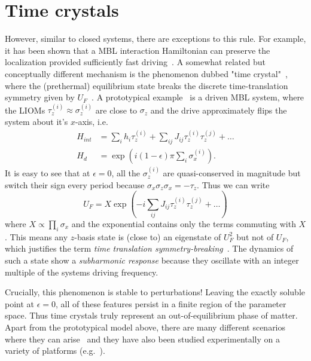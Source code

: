 \section{Time crystals}

However, similar to closed systems, there are exceptions to this rule.
For example, it has been shown that a MBL interaction Hamiltonian can preserve the localization provided sufficiently fast driving~\cite{abaninTheoryManybodyLocalization2016,burauFateAlgebraicManybody2021,sierantStabilityManybodyLocalization2023}. 
A somewhat related but conceptually different mechanism is the phenomenon dubbed "time crystal"~\cite{vonkeyserlingkAbsoluteStabilitySpatiotemporal2016,elsePrethermalPhasesMatter2017}, where the (prethermal) equilibrium state breaks the discrete time-translation symmetry given by $U_F$~\cite{khemaniBriefHistoryTime2019,elseDiscreteTimeCrystals2020a}. A prototypical example~\cite{elseFloquetTimeCrystals2016,elseDiscreteTimeCrystals2020a} is a driven MBL system, where the LIOMs $\tau_z^{(i)}\approx\sigma_z^{(i)}$ are close to $\sigma_z$ and the drive approximately flips the system about it's $x$-axis, i.e.
\begin{align}
	H_{int} &= \sum_i h_i \tau_z^{(i)} + \sum_{ij} J_{ij}\tau_z^{(i)}\tau_z^{(j)}+\ldots\\
	H_{d}&=\exp(i(1-\epsilon)\pi\sum_i \sigma_x^{(i)}).
\end{align}
It is easy to see that at $\epsilon=0$, all the $\sigma_z^{(i)}$ are quasi-conserved in magnitude but switch their sign every period because $\sigma_x \sigma_z \sigma_x = -\tau_z$. Thus we can write
\begin{equation}
	U_F = X\exp(-i\sum_{ij} J_{ij}\tau_z^{(i)}\tau_z^{(j)} + \ldots )
\end{equation}
where $X\propto\prod_i \sigma_x$ and the exponential contains only the terms commuting with $X$. This means any $z$-basis state is (close to) an eigenstate of $U_F^2$ but not of $U_F$, which justifies the term \emph{time translation symmetry-breaking}~\cite{elseFloquetTimeCrystals2016}. The dynamics of such a state show a \emph{subharmonic response} because they oscillate with an integer multiple of the systems driving frequency.

Crucially, this phenomenon is stable to perturbations! Leaving the exactly soluble point at $\epsilon=0$, all of these features persist in a finite region of the parameter space. Thus time crystals truly represent an out-of-equilibrium phase of matter. Apart from the prototypical model above, there are many different scenarios where they can arise~\cite{khemaniBriefHistoryTime2019,elseDiscreteTimeCrystals2020a} and they have also been studied experimentally on a variety of platforms (e.g.~\cite{choiObservationDiscreteTimecrystalline2017,miTimeCrystallineEigenstateOrder2021,ippolitiManybodyPhysicsNISQ2021,randallManybodyLocalizedDiscrete2021}).
	

